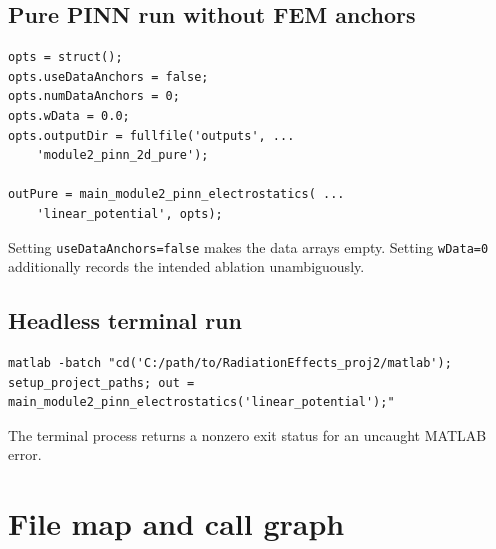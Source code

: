 \documentclass[11pt]{article}
\begin{document}
\subsection{Pure PINN run without FEM anchors}

\begin{lstlisting}[style=projectmatlab]
opts = struct();
opts.useDataAnchors = false;
opts.numDataAnchors = 0;
opts.wData = 0.0;
opts.outputDir = fullfile('outputs', ...
    'module2_pinn_2d_pure');

outPure = main_module2_pinn_electrostatics( ...
    'linear_potential', opts);
\end{lstlisting}
Setting \texttt{useDataAnchors=false} makes the data arrays empty. Setting \texttt{wData=0} additionally records the intended ablation unambiguously.

\subsection{Headless terminal run}

\begin{lstlisting}[style=projectshell]
matlab -batch "cd('C:/path/to/RadiationEffects_proj2/matlab'); setup_project_paths; out = main_module2_pinn_electrostatics('linear_potential');"
\end{lstlisting}
The terminal process returns a nonzero exit status for an uncaught MATLAB error.

\section{File map and call graph}
\end{document}

